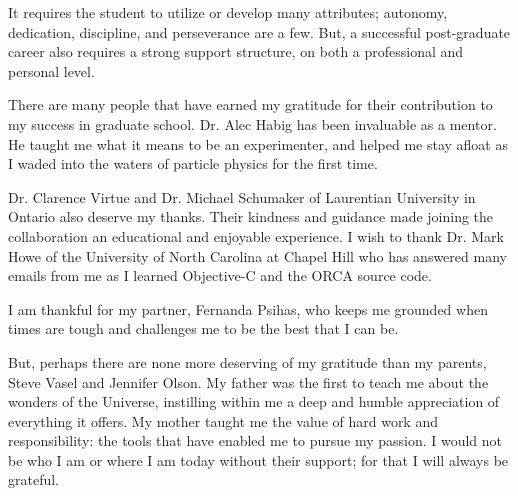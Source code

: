 %
%
%
%



 It requires the student to utilize or develop many attributes; autonomy, dedication, discipline, and perseverance are a few. But, a successful post-graduate career also requires a strong support structure, on both a professional and personal level. 

There are many people that have earned my gratitude for their contribution to my success in graduate school. Dr. Alec Habig has been invaluable as a mentor. He taught me what it means to be an experimenter, and helped me stay afloat as I waded into the waters of particle physics for the first time.

Dr. Clarence Virtue and Dr. Michael Schumaker of Laurentian University in Ontario also deserve my thanks. Their kindness and guidance made joining the collaboration an educational and enjoyable experience. I wish to thank Dr. Mark Howe of the University of North Carolina at Chapel Hill who has answered many emails from me as I learned Objective-C and the ORCA source code.

I am thankful for my partner, Fernanda Psihas, who keeps me grounded when times are tough and challenges me to be the best that I can be.

But, perhaps there are none more deserving of my gratitude than my parents, Steve Vasel and Jennifer Olson. My father was the first to teach me about the wonders of the Universe, instilling within me a deep and humble appreciation of everything it offers. My mother taught me the value of hard work and responsibility: the tools that have enabled me to pursue my passion. I would not be who I am or where I am today without their support; for that I will always be grateful.


